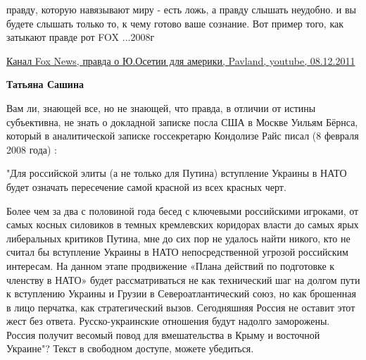 \begin{itemize}
\begin{itemize}
 

правду, которую навязывают миру - есть ложь, а правду слышать неудобно. и вы
будете слышать только то, к чему готово ваше сознание. Вот пример того, как
затыкают правде рот FOX ...2008г 

\href{https://www.youtube.com/watch?v=kUbeshzD_WM}{%
Канал Fox News, правда о Ю.Осетии для америки, Pavland, youtube, 08.12.2011%
}

 
\textbf{Татьяна Сашина} 

Вам ли, знающей все, но не знающей, что правда, в отличии от истины
субъективна, не знать о докладной записке посла США в Москве Уильям Бёрнса,
который в аналитической записке госсекретарю Кондолизе Райс писал (8 февраля
2008 года) :

"Для российской элиты (а не только для Путина) вступление Украины в НАТО будет
означать пересечение самой красной из всех красных черт.

Более чем за два с половиной года бесед с ключевыми российскими игроками, от
самых косных силовиков в темных кремлевских коридорах власти до самых ярых
либеральных критиков Путина, мне до сих пор не удалось найти никого, кто не
считал бы вступление Украины в НАТО непосредственной угрозой российским
интересам. На данном этапе продвижение «Плана действий по подготовке к членству
в НАТО» будет рассматриваться не как технический шаг на долгом пути к
вступлению Украины и Грузии в Североатлантический союз, но как брошенная в лицо
перчатка, как стратегический вызов. Сегодняшняя Россия не оставит этот жест без
ответа. Русско-украинские отношения будут надолго заморожены. Россия получит
весомый повод для вмешательства в Крыму и восточной Украине"? Текст в свободном
доступе, можете убедиться.

 

\end{itemize}
\end{itemize}
